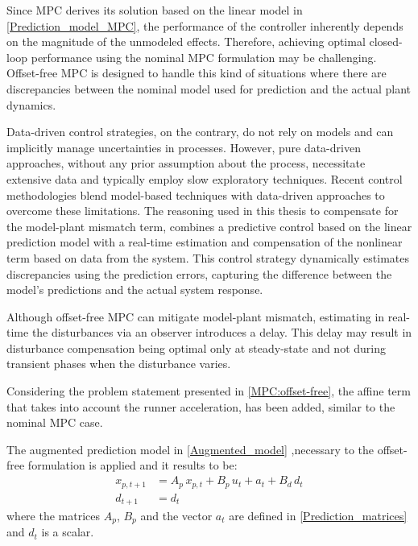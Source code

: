 \documentclass[a4paper,12pt,oneside]{book}
\begin{document}
\bigskip
Since MPC derives its solution based on the linear model in \eqref{Prediction_model_MPC}, the performance of the controller inherently depends on the magnitude of the unmodeled effects.
Therefore, achieving optimal closed-loop performance using the nominal MPC formulation may be challenging.
Offset-free MPC is designed to handle this kind of situations where there are discrepancies between the nominal model used for prediction and the actual plant dynamics. 

\bigskip
Data-driven control strategies, on the contrary, do not rely on models and can implicitly manage uncertainties in processes. 
However, pure data-driven approaches, without any prior assumption about the process, necessitate extensive data and typically employ slow exploratory techniques.
Recent control methodologies blend model-based techniques with data-driven approaches to overcome these limitations.
The reasoning used in this thesis to compensate for the model-plant mismatch term, combines a predictive control based on the linear prediction model with a real-time estimation and compensation of the nonlinear term based on data from the system.
This control strategy dynamically estimates discrepancies using the prediction errors, capturing the difference between the model's predictions and the actual system response.

Although offset-free MPC can mitigate model-plant mismatch, estimating in real-time the disturbances via an observer introduces a delay. 
This delay may result in disturbance compensation being optimal only at steady-state and not during transient phases when the disturbance varies.

\bigskip
Considering the problem statement presented in \eqref{MPC:offset-free}, the affine term that takes into account the runner acceleration, has been added, similar to the nominal MPC case.

The augmented prediction model in \eqref{Augmented_model} ,necessary to the offset-free formulation is applied and it results to be:
\begin{equation}
\begin{aligned}
	x_{p,t+1} & = A_p \, x_{p,t} + B_p \, u_t + a_t + B_d \, d_t \\
    	d_{t+1} & = d_t
\end{aligned}
\label{Offset-free_prediction_model_MPC}
\end{equation}
where the matrices $A_p$, $B_p$ and the vector $a_t$ are defined in \eqref{Prediction_matrices} and $d_t$ is a scalar.
\end{document}
